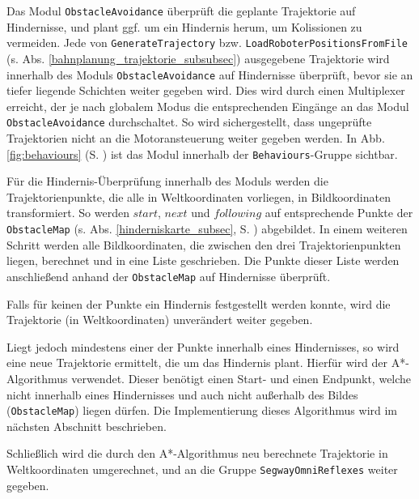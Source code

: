 Das Modul \lstinline{ObstacleAvoidance} überprüft die geplante Trajektorie auf Hindernisse, und plant ggf. um ein Hindernis herum, um Kolissionen zu vermeiden.
Jede von \lstinline{GenerateTrajectory} bzw. \lstinline{LoadRoboterPositionsFromFile} (s. Abs. \ref{bahnplanung_trajektorie_subsubsec}) ausgegebene Trajektorie wird innerhalb des Moduls \lstinline{ObstacleAvoidance} auf Hindernisse überprüft, bevor sie an tiefer liegende Schichten weiter gegeben wird.
Dies wird durch einen Multiplexer erreicht, der je nach globalem Modus die entsprechenden Eingänge an das Modul \lstinline{ObstacleAvoidance} durchschaltet.
So wird sichergestellt, dass ungeprüfte Trajektorien nicht an die Motoransteuerung weiter gegeben werden.
In Abb. \ref{fig:behaviours} (S. \pageref{fig:behaviours}) ist das Modul innerhalb der \lstinline{Behaviours}-Gruppe sichtbar.

Für die Hindernis-Überprüfung innerhalb des Moduls werden die Trajektorienpunkte, die alle in Weltkoordinaten vorliegen, in Bildkoordinaten transformiert.
So werden $start$, $next$ und $following$ auf entsprechende Punkte der \lstinline{ObstacleMap} (s. Abs. \ref{hinderniskarte_subsec}, S. \pageref{hinderniskarte_subsec}) abgebildet.
In einem weiteren Schritt werden alle Bildkoordinaten, die zwischen den drei Trajektorienpunkten liegen, berechnet und in eine Liste geschrieben.
Die Punkte dieser Liste werden anschließend anhand der \lstinline{ObstacleMap} auf Hindernisse überprüft.

Falls für keinen der Punkte ein Hindernis festgestellt werden konnte, wird die Trajektorie (in Weltkoordinaten) unverändert weiter gegeben.

Liegt jedoch mindestens einer der Punkte innerhalb eines Hindernisses, so wird eine neue Trajektorie ermittelt, die um das Hindernis plant.
Hierfür wird der A*-Algorithmus verwendet.
Dieser benötigt einen Start- und einen Endpunkt, welche nicht innerhalb eines Hindernisses und auch nicht außerhalb des Bildes (\lstinline{ObstacleMap}) liegen dürfen.
Die Implementierung dieses Algorithmus wird im nächsten Abschnitt beschrieben.

Schließlich wird die durch den A*-Algorithmus neu berechnete Trajektorie in Weltkoordinaten umgerechnet, und an die Gruppe \lstinline{SegwayOmniReflexes} weiter gegeben.


